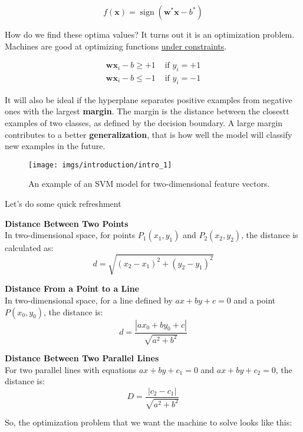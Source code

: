 \begin{equation*}
	f(\mathbf{x})=\operatorname{sign}\left(\mathbf{w}^* \mathbf{x}-b^*\right)
\end{equation*}


How do we find these optima values? It turns out it is an optimization problem. Machines are good at optimizing functions \underline{under constraints}.

$$
	\begin{array}{ll}
		\mathbf{w} \mathbf{x}_{i}-b \geq+1 & \text { if } y_{i}=+1 \\
		\mathbf{w} \mathbf{x}_{i}-b \leq-1 & \text { if } y_{i}=-1
	\end{array}
$$

It will also be ideal if the hyperplane separates positive examples from negative ones with the largest \textbf{margin}. The margin is the distance between the closestt examples of two classes, as defined by the decision boundary. A large margin contributes to a better \textbf{generalization}, that is how well the model will classify new examples in the future.

\begin{figure}[H]
	\centering
	\texttt{[image: imgs/introduction/intro\_1]}
	\caption{An example of an SVM model for two-dimensional feature vectors.}
	\label{fig:intro1}
\end{figure}

Let's do some quick refreshment
\vspace*{1em}
\begin{tcolorbox}[enhanced jigsaw, breakable, pad at break*=1mm, colback=gray!20!white, colframe=black!85!black, title=\textbf{Distance Formulas in Euclidean Space}]
	\textbf{Distance Between Two Points} \\
	In two-dimensional space, for points \( P_1(x_1, y_1) \) and \( P_2(x_2, y_2) \), the distance is calculated as:
	\[ d = \sqrt{(x_2 - x_1)^2 + (y_2 - y_1)^2} \]

	\textbf{Distance From a Point to a Line} \\
	In two-dimensional space, for a line defined by \( ax + by + c = 0 \) and a point \( P(x_0, y_0) \), the distance is:
	\[ d = \frac{|ax_0 + by_0 + c|}{\sqrt{a^2 + b^2}} \]

	\textbf{Distance Between Two Parallel Lines} \\
	For two parallel lines with equations \( ax + by + c_1 = 0 \) and \( ax + by + c_2 = 0 \), the distance is:
	\[ D = \frac{|c_2 - c_1|}{\sqrt{a^2 + b^2}} \]
\end{tcolorbox}
\vspace*{1em}
So, the optimization problem that we want the machine to solve looks like this:

